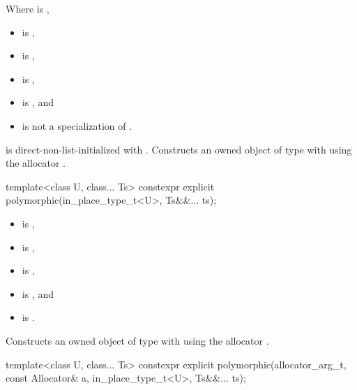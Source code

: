 \begin{itemdescr}
\pnum
\constraints
Where  is ,
\begin{itemize}
\item
{} is ,
\item
{} is ,
\item
{} is ,
\item
{} is , and
\item
{} is not a specialization of .
\end{itemize}

\pnum
\effects
{} is direct-non-list-initialized with .
Constructs an owned object of type  with 
using the allocator .
\end{itemdescr}

%
\begin{itemdecl}
template<class U, class... Ts>
  constexpr explicit polymorphic(in_place_type_t<U>, Ts&&... ts);
\end{itemdecl}

\begin{itemdescr}
\pnum
\constraints
\begin{itemize}
\item
{} is ,
\item
{} is ,
\item
{} is ,
\item
{} is , and
\item
{} is .
\end{itemize}

\pnum
\effects
Constructs an owned object of type  with
using the allocator .
\end{itemdescr}

%
\begin{itemdecl}
template<class U, class... Ts>
  constexpr explicit polymorphic(allocator_arg_t, const Allocator& a,
                                 in_place_type_t<U>, Ts&&... ts);
\end{itemdecl}

